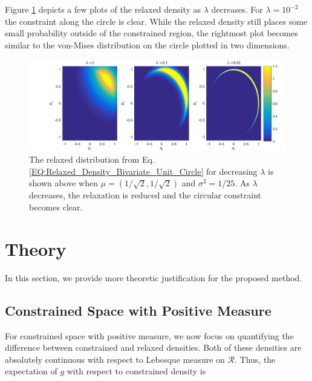 \documentclass[10pt,fleqn]{article} \pdfoutput=1
\DeclareMathOperator{\1}{\mathbbm{1}} \DeclareMathOperator{\bigO}{\mc O}
\begin{document}
Figure \ref{FIG:Bivariate_Normal_Unit_Circle_Constraint} depicts a few
plots of the relaxed density as $\lambda$ decreases.  For $\lambda=10^{-2}$
the constraint along the circle is clear. While the relaxed density still
places some small probability outside of the constrained region, the
rightmost plot becomes similar to the von-Mises distribution on the circle
plotted in two dimensions.




\begin{figure}[H]
	\begin{center}
		\includegraphics[width=1\textwidth]{Bivariate_Normal_Unit_Circle_Constraint}
		\caption{The relaxed distribution from Eq.
			\eqref{EQ:Relaxed_Density_Bivariate_Unit_Circle} for decreasing
			$\lambda$ is shown above when $\mu = (1/\sqrt{2},1/\sqrt{2})$ and $\sigma^2
				= 1/25.$  As $\lambda$ decreases, the relaxation is reduced
			and the circular constraint becomes clear.}
		\label{FIG:Bivariate_Normal_Unit_Circle_Constraint} \end{center}
\end{figure}

\section{Theory} 

In this section, we provide more theoretic justification for the proposed
method.

\subsection{Constrained
	Space with Positive Measure } \label{SEC:Positive_measure_theory}

	For constrained space with positive measure, we now focus on
	quantifying the difference between constrained and relaxed
	densities.  Both of these densities are absolutely continuous with respect to Lebesque
measure on $\mathcal{R}$.  Thus, the expectation of $g$ with respect to
constrained density is 
\end{document}
